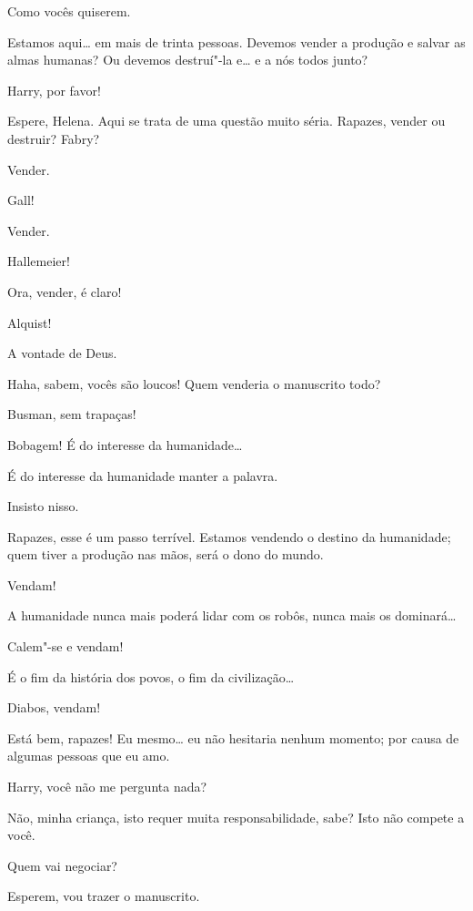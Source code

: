  Como vocês quiserem.

 Estamos aqui\ldots{} em mais de trinta pessoas. Devemos vender a
produção e salvar as almas humanas? Ou devemos destruí"-la e\ldots{} e a nós
todos junto?

 Harry, por favor!

 Espere, Helena. Aqui se trata de uma questão muito séria. Rapazes, vender
ou destruir? Fabry?

 Vender.

 Gall!

 Vender.

 Hallemeier!

 Ora, vender, é claro!

 Alquist!

 A vontade de Deus.

 Haha, sabem, vocês são loucos! Quem venderia o manuscrito todo?

 Busman, sem trapaças!

  Bobagem! É do interesse da humanidade\ldots{}

 É do interesse da humanidade manter a palavra.

 Insisto nisso.

 Rapazes, esse é um passo terrível. Estamos vendendo o destino da
humanidade; quem tiver a produção nas mãos, será o dono do mundo.

 Vendam!

 A humanidade nunca mais poderá lidar com os robôs, nunca mais os
dominará\ldots{}

 Calem"-se e vendam!

 É o fim da história dos povos, o fim da civilização\ldots{}

 Diabos, vendam!

 Está bem, rapazes! Eu mesmo\ldots{} eu não hesitaria nenhum momento; por causa
de algumas pessoas que eu amo.

 Harry, você não me pergunta nada?

 Não, minha criança, isto requer muita responsabilidade, sabe? Isto não compete a você.

 Quem vai negociar?

 Esperem, vou trazer o manuscrito. 

